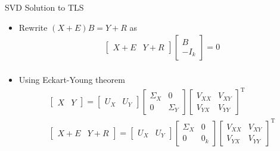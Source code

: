 \documentclass[handout]{beamer}
\begin{document}
\begin{frame}{SVD Solution to TLS}
\begin{itemize}
\item Rewrite $(X + E)B = Y + R$ as  
\begin{equation}
\begin{aligned}
\begin{bmatrix} X+E & Y+R \end{bmatrix} \begin{bmatrix} B \\ -I_k \end{bmatrix} = 0 \\
\end{aligned}
\end{equation}
\item Using Eckart-Young theorem
\begin{equation}
\begin{aligned}
\begin{bmatrix} X & Y \end{bmatrix} = \begin{bmatrix} U_X & U_Y \end{bmatrix} \begin{bmatrix} \Sigma_X & 0 \\ 0 & \Sigma_Y \end{bmatrix} \begin{bmatrix} V_{XX} & V_{XY} \\ V_{YX} & V_{YY} \end{bmatrix}^{\mathrm{T}} \\
\begin{bmatrix} X+E & Y+R \end{bmatrix} = \begin{bmatrix} U_X & U_Y \end{bmatrix} \begin{bmatrix} \Sigma_X & 0 \\ 0 & 0_k \end{bmatrix} \begin{bmatrix} V_{XX} & V_{XY} \\ V_{YX} & V_{YY} \end{bmatrix}^{\mathrm{T}}
\end{aligned}
\end{equation}
 
\end{itemize}
\end{frame}
%
\end{document}
